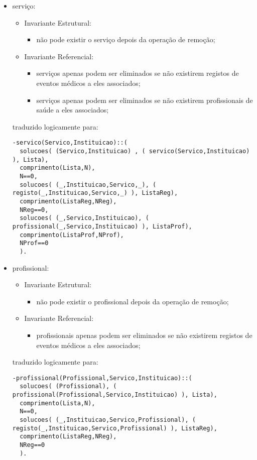 \documentclass[
  oneside,
  10pt, a4paper,
  footinclude=true,
  headinclude=true,
  cleardoublepage=empty
]{scrbook}
\begin{document}
\begin{itemize}
\item   serviço:
\begin{itemize}
\item        Invariante Estrutural:
\begin{itemize}
\item         não pode existir o serviço depois da operação de remoção;
\end{itemize}
\item        Invariante Referencial:
\begin{itemize}
\item         serviços apenas podem ser eliminados se não existirem registos de eventos médicos a eles associados;
\item         serviços apenas podem ser eliminados se não existirem profissionais de saúde a eles associados;
\end{itemize}
\end{itemize}
traduzido logicamente para:
\begin{lstlisting}
-servico(Servico,Instituicao)::(
  solucoes( (Servico,Instituicao) , ( servico(Servico,Instituicao) ), Lista),
  comprimento(Lista,N),
  N==0,
  solucoes( (_,Instituicao,Servico,_), ( registo(_,Instituicao,Servico,_) ), ListaReg),
  comprimento(ListaReg,NReg),
  NReg==0,
  solucoes( (_,Servico,Instituicao), ( profissional(_,Servico,Instituicao) ), ListaProf),
  comprimento(ListaProf,NProf),
  NProf==0
  ).
\end{lstlisting}

\item   profissional:
\begin{itemize}
\item        Invariante Estrutural:
\begin{itemize}
\item         não pode existir o profissional depois da operação de remoção;
\end{itemize}
\item        Invariante Referencial:
\begin{itemize}
\item         profissionais apenas podem ser eliminados se não existirem registos de eventos médicos a eles associados;
\end{itemize}
\end{itemize}
traduzido logicamente para:
\begin{lstlisting}
-profissional(Profissional,Servico,Instituicao)::(
  solucoes( (Profissional), ( profissional(Profissional,Servico,Instituicao) ), Lista),
  comprimento(Lista,N),
  N==0,
  solucoes( (_,Instituicao,Servico,Profissional), ( registo(_,Instituicao,Servico,Profissional) ), ListaReg),
  comprimento(ListaReg,NReg),
  NReg==0
  ).
\end{lstlisting}


\end{itemize}
\end{document}
